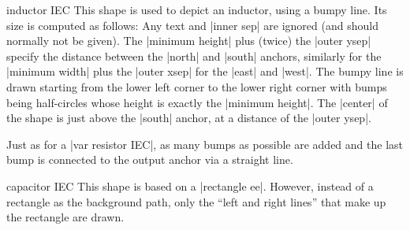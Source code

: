 \begin{shape}{inductor IEC}
    This shape is used to depict an inductor, using a bumpy line. Its size is
    computed as follows: Any text and |inner sep| are ignored (and should
    normally not be given). The |minimum height| plus (twice) the |outer ysep|
    specify the distance between the |north| and |south| anchors, similarly for
    the |minimum width| plus the |outer xsep| for the |east| and |west|. The
    bumpy line is drawn starting from the lower left corner to the lower right
    corner with bumps being half-circles whose height is exactly the
    |minimum height|. The |center| of the shape is just above the |south|
    anchor, at a distance of the |outer ysep|.
\begin{codeexample}[preamble={\usetikzlibrary{circuits.ee.IEC}}]
\end{codeexample}
    Just as for a |var resistor IEC|, as many bumps as possible are added and
    the last bump is connected to the output anchor via a straight line.
\end{shape}

\begin{shape}{capacitor IEC}
    This shape is based on a |rectangle ee|. However, instead of a rectangle as
    the background path, only the ``left and right lines'' that make up the
    rectangle are drawn.
\begin{codeexample}[preamble={\usetikzlibrary{circuits.ee.IEC}}]
\end{codeexample}
\end{shape}


